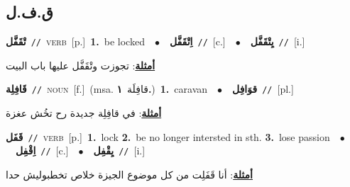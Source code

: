 \documentclass[10pt,a4paper,twoside]{article} %
\begin{document}
\begin{multicols}{2}
\vspace{-3mm}
\subsection*{\color{blue}\foreignlanguage{arabic}{ق.ف.ل}\color{blue}{}} 

{\setlength\topsep{0pt}\textbf{\foreignlanguage{arabic}{تْقَفَّل}}\ {\color{gray}\texttt{//}\color{black}}\ \textsc{verb}\ [p.]\ \textbf{1.}~be locked\ \ $\bullet$\ \ \setlength\topsep{0pt}\textbf{\foreignlanguage{arabic}{اِتْقَفَّل}}\ {\color{gray}\texttt{//}\color{black}}\ [c.]\ \ $\bullet$\ \ \setlength\topsep{0pt}\textbf{\foreignlanguage{arabic}{يِتْقَفَّل}}\ {\color{gray}\texttt{//}\color{black}}\ [i.]\  \begin{flushright}\color{gray}\foreignlanguage{arabic}{\textbf{\underline{\foreignlanguage{arabic}{أمثلة}}}: تجوزت وتْقَفَّل عليها باب البيت}\end{flushright}\color{black}} \vspace{2mm}

{\setlength\topsep{0pt}\textbf{\foreignlanguage{arabic}{قَافِلِة}}\ {\color{gray}\texttt{//}\color{black}}\ \textsc{noun}\ [f.]\ \color{gray}(msa. \foreignlanguage{arabic}{قافِلَة}~\foreignlanguage{arabic}{\textbf{١.}})\color{black}\ \textbf{1.}~caravan\ \ $\bullet$\ \ \setlength\topsep{0pt}\textbf{\foreignlanguage{arabic}{قوَافِل}}\ {\color{gray}\texttt{//}\color{black}}\ [pl.]\  \begin{flushright}\color{gray}\foreignlanguage{arabic}{\textbf{\underline{\foreignlanguage{arabic}{أمثلة}}}: في قافِلِة جديدة رح تخُش عغزة}\end{flushright}\color{black}} \vspace{2mm}

{\setlength\topsep{0pt}\textbf{\foreignlanguage{arabic}{قَفَل}}\ {\color{gray}\texttt{//}\color{black}}\ \textsc{verb}\ [p.]\ \textbf{1.}~lock  \textbf{2.}~be no longer intersted in sth.  \textbf{3.}~lose passion\ \ $\bullet$\ \ \setlength\topsep{0pt}\textbf{\foreignlanguage{arabic}{اِقْفِل}}\ {\color{gray}\texttt{//}\color{black}}\ [c.]\ \ $\bullet$\ \ \setlength\topsep{0pt}\textbf{\foreignlanguage{arabic}{يِقْفِل}}\ {\color{gray}\texttt{//}\color{black}}\ [i.]\  \begin{flushright}\color{gray}\foreignlanguage{arabic}{\textbf{\underline{\foreignlanguage{arabic}{أمثلة}}}: أنا قَفَلِت من كل موضوع الجيزة خلاص تخطبوليش حدا}\end{flushright}\color{black}} \vspace{2mm}


\end{multicols}
\end{document}
